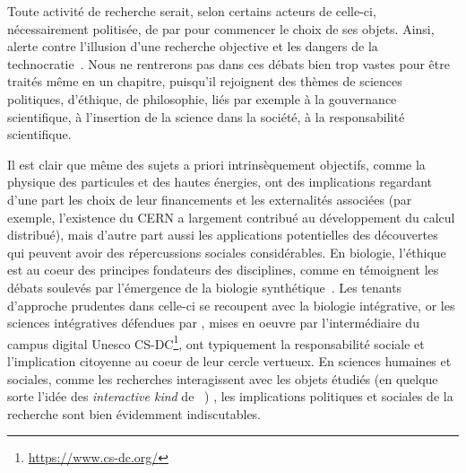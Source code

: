 





\label{ch:positioning} %



\bigskip


Toute activité de recherche serait, selon certains acteurs de celle-ci, nécessairement politisée, de par pour commencer le choix de ses objets. Ainsi,  alerte contre l'illusion d'une recherche objective et les dangers de la technocratie~\cite{ripoll2017jig}. Nous ne rentrerons pas dans ces débats bien trop vastes pour être traités même en un chapitre, puisqu'il rejoignent des thèmes de sciences politiques, d'éthique, de philosophie, liés par exemple à la gouvernance scientifique, à l'insertion de la science dans la société, à la responsabilité scientifique.


 Il est clair que même des sujets a priori intrinsèquement objectifs, comme la physique des particules et des hautes énergies, ont des implications regardant d'une part les choix de leur financements et les externalités associées (par exemple, l'existence du CERN a largement contribué au développement du calcul distribué), mais d'autre part aussi les applications potentielles des découvertes qui peuvent avoir des répercussions sociales considérables. En biologie, l'éthique est au coeur des principes fondateurs des disciplines, comme en témoignent les débats soulevés par l'émergence de la biologie synthétique~\cite{gutmann2011ethics}. Les tenants d'approche prudentes dans celle-ci se recoupent avec la biologie intégrative, or les sciences intégratives défendues par , mises en oeuvre par l'intermédiaire du campus digital Unesco CS-DC\footnote{\url{https://www.cs-dc.org/}}, ont typiquement la responsabilité sociale et l'implication citoyenne au coeur de leur cercle vertueux. En sciences humaines et sociales, comme les recherches interagissent avec les objets étudiés (en quelque sorte l'idée des \emph{interactive kind} de ~\cite{hacking1999social})%
 , les implications politiques et sociales de la recherche sont bien évidemment indiscutables.
 
